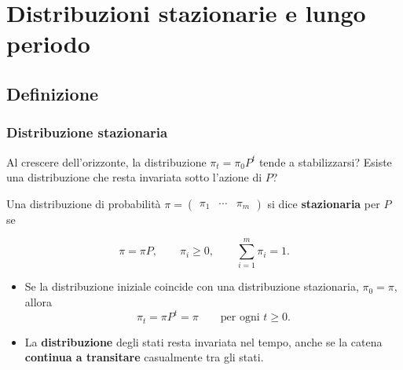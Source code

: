 \documentclass[handout]{beamer}%
\newenvironment{stepitemize}{\begin{itemize}[<+->]}{\end{itemize} }
\providecommand{\QTR}[2]{\csname #1\endcsname{#2}}
\begin{document}


\section{Distribuzioni stazionarie e lungo periodo}

\subsection{Definizione}%

\begin{frame}%
%

\frametitle{Distribuzione stazionaria}%
%

%


Al crescere dell'orizzonte, la distribuzione $\pi_{t}=\pi_{0}P^{t}$ tende a
stabilizzarsi? Esiste una distribuzione che resta invariata sotto l'azione di
$P$?

\medskip

Una distribuzione di probabilit\`{a} $\pi=
\begin{pmatrix}
\pi_{1} & \cdots & \pi_{m}%
\end{pmatrix}
$ si dice \textbf{stazionaria} per $P$ se%

\[
\pi=\pi P, \qquad\pi_{i}\geq0, \qquad\sum_{i=1}^{m}\pi_{i}=1.
\]


\medskip

\begin{stepitemize}
\item Se la distribuzione iniziale coincide con una distribuzione stazionaria,
$\pi_{0}=\pi$, allora
\[
\pi_{t}=\pi P^{t}=\pi\qquad\text{per ogni }t\geq0.
\]


\item La \textbf{distribuzione} degli stati resta invariata nel tempo, anche
se la catena \textbf{continua a transitare} casualmente tra gli stati.
\end{stepitemize}%

\transboxout
\end{frame}%
\end{document}
